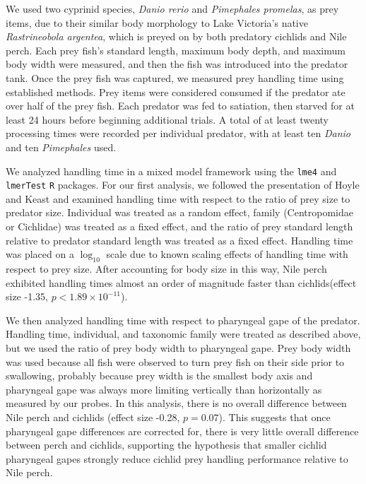 We used two cyprinid species, {\em Danio rerio} and {\em Pimephales promelas}, as prey items, due to their similar body morphology to Lake Victoria's native {\em Rastrineobola argentea}, which is preyed on by both predatory cichlids and Nile perch. \cite{van_oijen_ecological_1982} Each prey fish's standard length, maximum body depth, and maximum body width were measured, and then the fish was introduced into the predator tank. Once the prey fish was captured, we measured prey handling time using established methods. \cite{hoyle1987effect} Prey items were considered consumed if the predator ate over half of the prey fish. Each predator was fed to satiation, then starved for at least 24 hours before beginning additional trials. A total of at least twenty processing times were recorded per individual predator, with at least ten {\em Danio} and ten {\em Pimephales} used.
	
We analyzed handling time in a mixed model framework using the {\tt lme4} \cite{bates2010lme4} and {\tt lmerTest} \cite{kuznetsova2013lmertest} {\tt R} packages. For our first analysis, we followed the presentation of Hoyle and Keast \cite{hoyle1987effect} and examined handling time with respect to the ratio of prey size to predator size. Individual was treated as a random effect, family (Centropomidae or Cichlidae) was treated as a fixed effect, and the ratio of prey standard length relative to predator standard length was treated as a fixed effect. Handling time was placed on a $\log_{10}$ scale due to known scaling effects of handling time with respect to prey size. \cite{hoyle1987effect} After accounting for body size in this way, Nile perch exhibited handling times almost an order of magnitude faster than cichlids(effect size -1.35, $p<1.89\times 10^{-11}$).

We then analyzed handling time with respect to pharyngeal gape of the predator. Handling time, individual, and taxonomic family were treated as described above, but we used the ratio of prey body width to pharyngeal gape. Prey body width was used because all fish were observed to turn prey fish on their side prior to swallowing, probably because prey width is the smallest body axis and pharyngeal gape was always more limiting vertically than horizontally as measured by our probes. In this analysis, there is no overall difference between Nile perch and cichlids (effect size -0.28, $p=0.07$). This suggests that once pharyngeal gape differences are corrected for, there is very little overall difference between perch and cichlids, supporting the hypothesis that smaller cichlid pharyngeal gapes strongly reduce cichlid prey handling performance relative to Nile perch.

